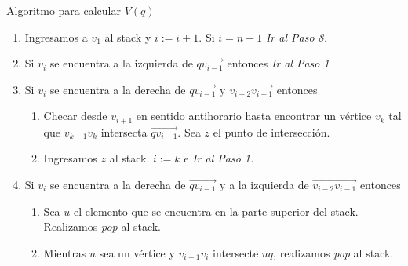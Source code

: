 \documentclass[aspectratio=169,xcolor=dvipsnames, t]{beamer}
\begin{document}
\begin{frame}{Algoritmo para calcular $V(q)$}
  \begin{enumerate}
  \item Ingresamos a $v_{1}$ al stack y $i := i + 1$. Si $i = n + 1$ \textit{Ir al Paso 8.}
  \item Si $v_{i}$ se encuentra a la izquierda de $\overrightarrow{qv_{i-1}}$ entonces \textit{Ir al Paso 1}
  \item Si $v_{i}$ se encuentra a la derecha de $\overrightarrow{qv_{i-1}}$ y $\overrightarrow{v_{i-2}v_{i-1}}$ entonces
    \begin{enumerate}
    \item Checar desde $v_{i+1}$ en sentido antihorario hasta encontrar un vértice $v_{k}$ tal que $v_{k-1}v_{k}$ intersecta $\overrightarrow{qv_{i-1}}$. Sea $z$ el punto de intersección.
    \item Ingresamos $z$ al stack. $i := k$ e \textit{Ir al Paso 1.}
    \end{enumerate}
  \item Si $v_{i}$ se encuentra a la derecha de $\overrightarrow{qv_{i-1}}$ y a la izquierda de $\overrightarrow{v_{i-2}v_{i-1}}$ entonces
    \begin{enumerate}
    \item Sea $u$ el elemento que se encuentra en la parte superior del stack. Realizamos \textit{pop} al stack.
    \item Mientras $u$ sea un vértice y $v_{i-1}v_{i}$ intersecte $uq$, realizamos \textit{pop} al stack. 
    \end{enumerate}
  \end{enumerate}
\end{frame}
\end{document}
